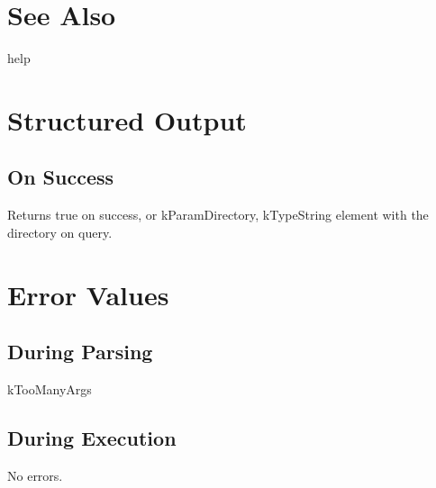 \documentclass[10pt]{article}
\begin{document}
\section*{ See Also }


 help
\section*{ Structured Output }
\subsection*{ On Success }


 Returns true on success, or kParamDirectory, kTypeString element with the directory on query. 
\section*{ Error Values }
\subsection*{ During Parsing }


 kTooManyArgs
\subsection*{ During Execution }


 No errors. 
\end{document}
